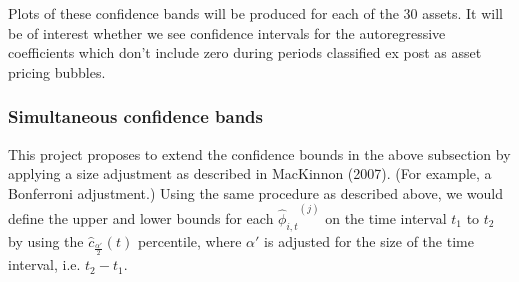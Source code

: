 \documentclass{article}
\begin{document}
\noindent
Plots of these confidence bands will be produced for each of the 30 assets. It will be of interest whether we see confidence intervals for the autoregressive coefficients which don't include zero during periods classified ex post as asset pricing bubbles.

\subsubsection{Simultaneous confidence bands}
This project proposes to extend the confidence bounds in the above subsection by applying a size adjustment as described in MacKinnon (2007). (For example, a Bonferroni adjustment.) Using the same procedure as described above, we would define the upper and lower bounds for each \( {{\hat{\phi}}_{i,t}}^{(j)} \) on the time interval \(t_{1}\) to \(t_{2}\) by using the \(\hat{c}_{\frac{\alpha'}{2}}(t)\) percentile, where \(\alpha'\) is adjusted for the size of the time interval, i.e. \(t_{2} - t_{1}\).
\end{document}
